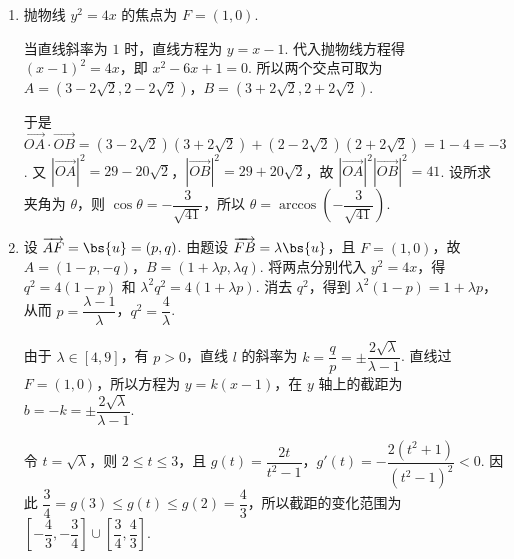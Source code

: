 \begin{solution}
\begin{enumerate}
\item
抛物线 \(y^2=4x\) 的焦点为 \(F=(1,0)\).

当直线斜率为 \(1\) 时，直线方程为 \(y=x-1\). 代入抛物线方程得 \((x-1)^2=4x\)，即 \(x^2-6x+1=0\). 所以两个交点可取为 \(A=(3-2\sqrt2,2-2\sqrt2)\)，\(B=(3+2\sqrt2,2+2\sqrt2)\).

于是 \(\overrightarrow{OA}\cdot\overrightarrow{OB}=(3-2\sqrt2)(3+2\sqrt2)+(2-2\sqrt2)(2+2\sqrt2)=1-4=-3\). 又 \(\left|\overrightarrow{OA}\right|^2=29-20\sqrt2\)，\(\left|\overrightarrow{OB}\right|^2=29+20\sqrt2\)，故 \(\left|\overrightarrow{OA}\right|^2\left|\overrightarrow{OB}\right|^2=41\). 设所求夹角为 \(\theta\)，则 \(\cos\theta=-\dfrac{3}{\sqrt{41}}\)，所以 \(\theta=\arccos\left(-\dfrac{3}{\sqrt{41}}\right)\).

\item
设 \(\overrightarrow{AF}=\bs{u}=(p,q)\). 由题设 \(\overrightarrow{FB}=\lambda\bs{u}\)，且 \(F=(1,0)\)，故 \(A=(1-p,-q)\)，\(B=(1+\lambda p,\lambda q)\). 将两点分别代入 \(y^2=4x\)，得 \(q^2=4(1-p)\) 和 \(\lambda^2q^2=4(1+\lambda p)\). 消去 \(q^2\)，得到 \(\lambda^2(1-p)=1+\lambda p\)，从而 \(p=\dfrac{\lambda-1}{\lambda}\)，\(q^2=\dfrac{4}{\lambda}\).

由于 \(\lambda\in[4,9]\)，有 \(p>0\)，直线 \(l\) 的斜率为 \(k=\dfrac{q}{p}=\pm\dfrac{2\sqrt{\lambda}}{\lambda-1}\). 直线过 \(F=(1,0)\)，所以方程为 \(y=k(x-1)\)，在 \(y\) 轴上的截距为 \(b=-k=\pm\dfrac{2\sqrt{\lambda}}{\lambda-1}\).

令 \(t=\sqrt{\lambda}\)，则 \(2\leqslant t\leqslant3\)，且 \(g(t)=\dfrac{2t}{t^2-1}\)，\(g'(t)=-\dfrac{2(t^2+1)}{(t^2-1)^2}<0\). 因此 \(\dfrac{3}{4}=g(3)\leqslant g(t)\leqslant g(2)=\dfrac{4}{3}\)，所以截距的变化范围为 \(\left[-\dfrac{4}{3},-\dfrac{3}{4}\right]\cup\left[\dfrac{3}{4},\dfrac{4}{3}\right]\).
\end{enumerate}
\end{solution}
